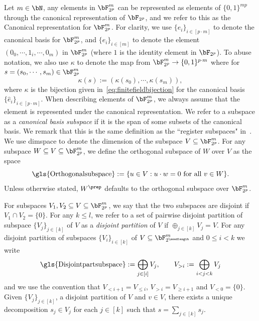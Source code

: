 
Let $m \in \bN$, any elements in $\bF_{2^p}^m$ can be represented as elements of $\{0,1\}^{mp}$ through the canonical representation of $\bF_{2^p}$, and we refer to this as the Canonical representation for $\bF_{2^p}^m$. For clarity, we use $\{\hat{e}_i\}_{i \in [p\cdot m]}$ to denote the canonical basis for $\bF_{2^p}^m$, and $\{e_i\}_{i \in [m]}$ to denote the element $(0_0,\cdots, 1_i, \cdots, 0_m)$ in $\bF_{2^p}^m$ (where $1$ is the identity element in $\bF_{2^p}$). To abuse notation, we also use $\kappa$ to denote the map from $\bF_{2^p}^m \rightarrow \{0,1\}^{p \cdot m}$ where for $s= (s_0, \cdots, s_m) \in \bF_{2^p}^m$ 
\begin{equation} \label{eq:canorepfinitefield}
	\kappa(s) := (\kappa(s_0), \cdots, \kappa(s_m)),
\end{equation}
where $\kappa$ is the bijection given in~\eqref{eq:finitefieldbijection} for the canonical basis $\{\hat{e}_i\}_{i \in [p\cdot m]}$.  When describing elements of $\bF_{2^p}^m$, we always assume that the element is represented under the canonical representation. We refer to a subspace as a \textit{canonical basis subspace} if it is the span of some subsets of the canonical basis. We remark that this is the same definition as the ``register subspaces" in~\cite{jiMIPRE2022a}. We use \gls{dimspace} to denote the dimension of the subspace $V \subseteq \bF_{2^p}^m$. For any subspace $W \subseteq V \subseteq  \bF_{2^p}^m$, we define the orthogonal subspace of $W$ over $V$ as the space
\begin{equation*}
\text{\gls{Orthogonalsubspace}} :=  \{ u \in V: u \cdot w = 0\text{ for all } v \in W \}.
\end{equation*}
Unless otherwise stated, $W^{\prep}$ defaults to the orthogonal subspace over $\bF_{2^p}^m$. 

For subspaces $V_1, V_2 \subseteq V  \subseteq \bF_{2^p}^m$, we say that the two subspaces are disjoint if $V_1 \cap V_2 = \{0\}$. For any $k \leq l$, we refer to a set of pairwise disjoint partition of subspace $\{V_j\}_{j \in [k]}$ of $V$ as a \textit{disjoint partition} of $V$ if $\oplus_{j \in [k]} V_j = V$. For any disjoint partition of subspaces $\{V_i\}_{i \in [k]}$ of $V \subseteq \bF_{2^\seedlength}^m$ and $0 \leq i < k$ we write 
\begin{equation*}
	\text{\gls{Disjointpartsubspace}} := \bigoplus_{j \in [i]} V_{j},  \qquad	V_{> i} := \bigoplus_{i < j < k} V_{j}
\end{equation*}
and we use the convention that $V_{< i+1} = V_{\leq i}$,  $V_{> i} = V_{\geq i+1}$ and $V_{< 0 } = \{0\}$. Given $\{V_j\}_{j \in [k]}$, a disjoint partition of $V$ and $v \in V$, there exists a unique decomposition $s_j \in V_j$ for each $j \in[k]$ such that $s = \sum_{j \in [k]} s_j$. 


